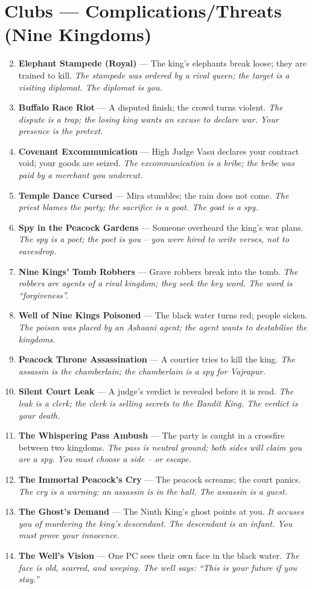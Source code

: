 \documentclass[11pt]{book}
\begin{document}
\section*{Clubs — Complications/Threats (Nine Kingdoms)}
\begin{enumerate}
\setcounter{enumi}{1}
\item \textbf{Elephant Stampede (Royal)} — The king’s elephants break loose; they are trained to kill. \textit{The stampede was ordered by a rival queen; the target is a visiting diplomat. The diplomat is you.}
\item \textbf{Buffalo Race Riot} — A disputed finish; the crowd turns violent. \textit{The dispute is a trap; the losing king wants an excuse to declare war. Your presence is the pretext.}
\item \textbf{Covenant Excommunication} — High Judge Vasu declares your contract void; your goods are seized. \textit{The excommunication is a bribe; the bribe was paid by a merchant you undercut.}
\item \textbf{Temple Dance Cursed} — Mira stumbles; the rain does not come. \textit{The priest blames the party; the sacrifice is a goat. The goat is a spy.}
\item \textbf{Spy in the Peacock Gardens} — Someone overheard the king’s war plans. \textit{The spy is a poet; the poet is you – you were hired to write verses, not to eavesdrop.}
\item \textbf{Nine Kings’ Tomb Robbers} — Grave robbers break into the tomb. \textit{The robbers are agents of a rival kingdom; they seek the key word. The word is “forgiveness”.}
\item \textbf{Well of Nine Kings Poisoned} — The black water turns red; people sicken. \textit{The poison was placed by an Ashaani agent; the agent wants to destabilise the kingdoms.}
\item \textbf{Peacock Throne Assassination} — A courtier tries to kill the king. \textit{The assassin is the chamberlain; the chamberlain is a spy for Vajrapur.}
\item \textbf{Silent Court Leak} — A judge’s verdict is revealed before it is read. \textit{The leak is a clerk; the clerk is selling secrets to the Bandit King. The verdict is your death.}
\item[J] \textbf{The Whispering Pass Ambush} — The party is caught in a crossfire between two kingdoms. \textit{The pass is neutral ground; both sides will claim you are a spy. You must choose a side – or escape.}
\item[Q] \textbf{The Immortal Peacock’s Cry} — The peacock screams; the court panics. \textit{The cry is a warning; an assassin is in the hall. The assassin is a guest.}
\item[K] \textbf{The Ghost’s Demand} — The Ninth King’s ghost points at you. \textit{It accuses you of murdering the king’s descendant. The descendant is an infant. You must prove your innocence.}
\item[A] \textbf{The Well’s Vision} — One PC sees their own face in the black water. \textit{The face is old, scarred, and weeping. The well says: “This is your future if you stay.”}
\end{enumerate}
\end{document}
